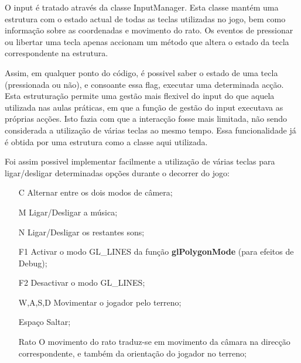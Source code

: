 O input é tratado através da classe InputManager. Esta classe mantém uma estrutura com o estado actual de todas as teclas utilizadas no jogo, bem como informação sobre as coordenadas e movimento do rato. Os eventos de pressionar ou libertar uma tecla apenas accionam um método que altera o estado da tecla correspondente na estrutura.

Assim, em qualquer ponto do código, é possivel saber o estado de uma tecla (pressionada ou não), e consoante essa flag, executar uma determinada acção. Esta estruturação permite uma gestão mais flexivel do input do que aquela utilizada nas aulas práticas, em que a função de gestão do input executava as próprias acções. Isto fazia com que a interacção fosse mais limitada, não sendo considerada a utilização de várias teclas ao mesmo tempo. Essa funcionalidade já é obtida por uma estrutura como a classe aqui utilizada.

Foi assim possivel implementar facilmente a utilização de várias teclas para ligar/desligar determinadas opções durante o decorrer do jogo:
\begin{itemize}
\item[C] Alternar entre os dois modos de câmera;
\item[M] Ligar/Desligar a música;
\item[N] Ligar/Desligar os restantes sons;
\item[F1] Activar o modo GL_LINES da função \textbf{glPolygonMode} (para efeitos de Debug);
\item[F2] Desactivar o modo GL_LINES;
\item[W,A,S,D] Movimentar o jogador pelo terreno;
\item[Espaço] Saltar;
\item[Rato] O movimento do rato traduz-se em movimento da câmara na direcção correspondente, e também da orientação do jogador no terreno;
\end{itemize}
